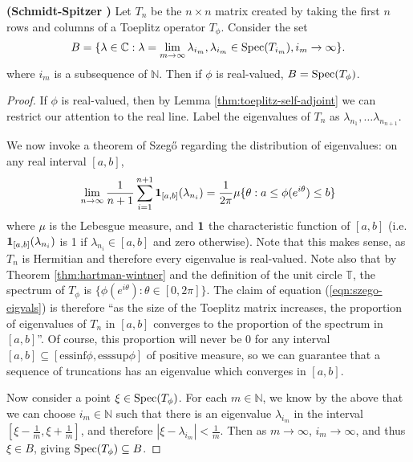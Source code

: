 \documentclass[../main.tex]{subfiles}
\begin{document}
\begin{theorem}{\textbf{(Schmidt-Spitzer \parencite{schmidt1960toeplitz})}}
Let $T_n$ be the $n \times n$ matrix created by taking the first $n$ rows and
columns of a Toeplitz operator $T_\phi$. Consider the set $$B =
\{\lambda \in \mathbb{C} : \lambda = \lim_{m \rightarrow \infty}
\lambda_{i_m}, \lambda_{i_m} \in \mathrm{Spec}(T_{i_m}), i_m \rightarrow \infty
\}.$$
where $i_m$ is a subsequence of $\mathbb{N}$. Then if $\phi$ is real-valued, $B = \mathrm{Spec}(T_\phi)$.
\end{theorem}
\begin{proof}
If $\phi$ is real-valued, then by Lemma \ref{thm:toeplitz-self-adjoint} we can
restrict our attention to the real line. Label the eigenvalues of $T_n$
as $\lambda_{n_1}, \hdots \lambda_{n_{n+1}}$. 
 
We now invoke a theorem of Szeg\H{o} \cite{grenander2001toeplitz} regarding the
distribution of eigenvalues: on any real interval $[a, b]$,
\begin{equation}
\label{eqn:szego-eigvals}
\lim_{n \rightarrow \infty} \frac{1}{n+1} \sum_{i=1}^{n+1} \mathbf{1}_{[a, b]}(\lambda_{n_i}) 
= \frac{1}{2 \pi} \mu\{\theta : a \leq \phi(e^{i \theta}) \leq b\}
\end{equation}
where $\mu$ is the Lebesgue measure, and $\mathbf{1}$ the characteristic function of $[a,b]$ 
(i.e. $\mathbf{1}_{[a, b]}(\lambda_{n_i})$ is 1 if $\lambda_{n_i} \in [a, b]$ and zero
otherwise). Note that this makes sense, as $T_n$ is Hermitian and
therefore every eigenvalue is real-valued. Note also that by Theorem
\ref{thm:hartman-wintner} and the definition of the unit circle
$\mathbb{T}$,
the spectrum of $T_\phi$ is $\{\phi(e^{i \theta}): \theta \in [0, 2\pi]\}$. The
claim of equation (\ref{eqn:szego-eigvals}) is therefore ``as the size
of the Toeplitz matrix increases, the proportion of eigenvalues of $T_n$
in $[a, b]$ converges to the proportion of the spectrum in $[a, b]$''. 
Of course, this proportion will never be 0 for any interval $[a, b] \subseteq
[\textrm{essinf}\phi, \textrm{esssup}\phi]$ of positive measure, so we
can guarantee that a sequence of truncations has an eigenvalue which
converges in $[a, b]$. 

Now consider a point $\xi \in \mathrm{Spec}(T_\phi)$. For each $m \in \mathbb{N}$, we
know by the above that we can choose $i_m \in \mathbb{N}$ such that
there is an eigenvalue $\lambda_{i_m}$ in the interval $[\xi -
\frac{1}{m}, \xi + \frac{1}{m}]$, and therefore $|\xi - \lambda_{i_m}| <
\frac{1}{m}$. Then as $m \rightarrow \infty$, $i_m \rightarrow \infty$,
and thus $\xi \in B$, giving $\mathrm{Spec}(T_\phi) \subseteq B$.


\end{proof}
\end{document}
